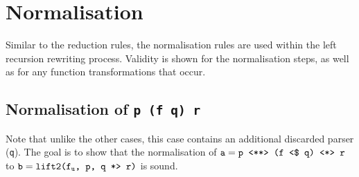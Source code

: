 \section{Normalisation}
\label{sec:sound_normalisation}

Similar to the reduction rules, the normalisation rules are used within the left recursion rewriting process.
Validity is shown for the normalisation steps, as well as for any function transformations that occur.

\subsection{Normalisation of \texttt{p \pa (f \constfmapl q) \ap r}}
Note that unlike the other cases, this case contains an additional discarded parser (\texttt{q}).
The goal is to show that the normalisation of $\texttt{a} = \texttt{p \pa (f \constfmapl q) \ap r}$ to $\texttt{b} = \texttt{lift2(f}_\texttt{u}\texttt{, p, q \apr r)}$ is sound.

